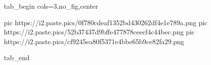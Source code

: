  
 
 
 
 


\ifcmt
  tab_begin cols=3,no_fig,center

     pic https://i2.paste.pics/0f780cdeaf1352bd430262df4e1e789a.png
		 pic https://i2.paste.pics/52b37437d9bffe477878ceecf4c44bec.png
		 pic https://i2.paste.pics/cf9245ea80f5371e4bbe65b9ce82fa29.png

  tab_end
\fi

